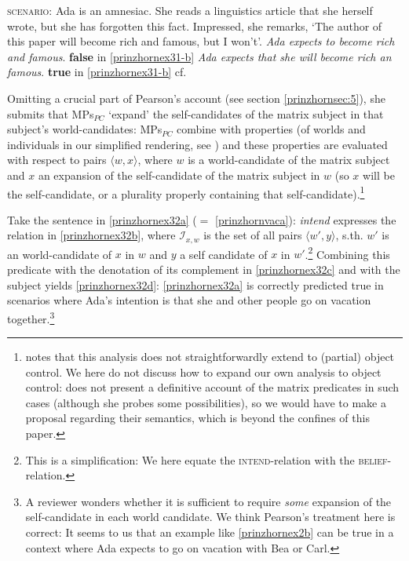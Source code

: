 \documentclass[output=paper,colorlinks,citecolor=brown,
]{langscibook}
\begin{document}
\ea 
\ea  \textsc{scenario:} Ada is an amnesiac. She reads a linguistics article that she herself wrote, but she has forgotten this fact. Impressed, she remarks, `The author of this paper will become rich
and famous, but I won't'. \label{prinzhornex31-b}
\ex  \textit{Ada expects to become rich and famous}. \hfill \textbf{false} in \ref{prinzhornex31-b} \label{prinzhornex31-c}
\ex \textit{Ada expects that she will become rich an famous}.  \hfill \textbf{true} in \ref{prinzhornex31-b}
\newline \phantom{.}\hfill cf. \cite[(9)]{Pearson:2016} \label{prinzhornex31-d}
\z\z 

Omitting a crucial part of Pearson's account (see section \ref{prinzhornsec:5}), she submits that MPs$_{PC}$ `expand' the self-candidates of the matrix subject in that subject's world-candidates: MPs$_{PC}$ combine with properties (of worlds and individuals in our simplified rendering, see \citealt{Chierchia:1989}) and these properties are evaluated with respect to pairs $\langle w, x \rangle$, where $w$ is a world-candidate of the matrix subject and $x$ an expansion of the self-candidate of the matrix subject in $w$ (so $x$ will be the self-candidate, or a plurality properly containing that self-candidate).\footnote{\cite{Pearson:2016} notes that this analysis does not straightforwardly extend to (partial) object control. We here do not discuss how to expand our own analysis to object control: \cite{Pearson:2016} does not present a definitive account of the matrix predicates in such cases (although she probes some possibilities), so we would have to make a proposal regarding their semantics, which is beyond the confines of this paper.}

Take the sentence in \ref{prinzhornex32a} ($\widehat{=}$ \ref{prinzhornvaca}): \textit{intend} expresses the relation in \ref{prinzhornex32b}, where  $\mathcal{I}_{x,w}$ is the set of all pairs $\langle w',y \rangle$, s.th. $w'$ is an world-candidate of $x$ in $w$ and $y$ a self candidate of $x$ in $w'$.\footnote{This is a simplification: We here equate the \textsc{intend}-relation with the \textsc{belief}-relation.} Combining this predicate with the denotation of its complement in \ref{prinzhornex32c} and with the subject yields \ref{prinzhornex32d}: \ref{prinzhornex32a} is correctly predicted true in scenarios where Ada's intention is that she and other people  go on vacation together.\footnote{A reviewer wonders whether it is sufficient to require \textit{some} expansion of the self-candidate in each world candidate. We think Pearson's treatment here is correct: It seems to us that an example like \ref{prinzhornex2b} can be true in a context where Ada expects to go on vacation with Bea or Carl.}
\end{document}

